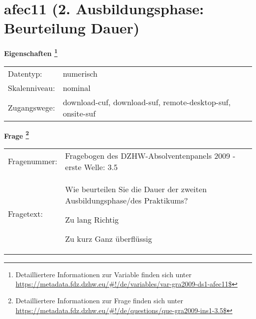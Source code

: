 
    \setcounter{footnote}{0}

    \vspace*{-1.8cm}
	\section{afec11 (2. Ausbildungsphase: Beurteilung Dauer)}
	\label{section:afec11}



    \vspace*{0.5cm}
    \noindent\textbf{Eigenschaften
	\footnote{Detailliertere Informationen zur Variable finden sich unter
		\url{https://metadata.fdz.dzhw.eu/\#!/de/variables/var-gra2009-ds1-afec11$}}}\\
	\begin{tabularx}{\hsize}{@{}lX}
	Datentyp: & numerisch \\
	Skalenniveau: & nominal \\
	Zugangswege: &
	  download-cuf, 
	  download-suf, 
	  remote-desktop-suf, 
	  onsite-suf
 \\
    \end{tabularx}



				\vspace*{0.5cm}
                \noindent\textbf{Frage
	                \footnote{Detailliertere Informationen zur Frage finden sich unter
		              \url{https://metadata.fdz.dzhw.eu/\#!/de/questions/que-gra2009-ins1-3.5$}}}\\
				\begin{tabularx}{\hsize}{@{}lX}
					Fragenummer: &
					  Fragebogen des DZHW-Absolventenpanels 2009 - erste Welle:
					  3.5
 \\
					Fragetext: & Wie beurteilen Sie die Dauer der zweiten Ausbildungsphase/des Praktikums?\par  Zu lang Richtig\par  Zu kurz Ganz überflüssig \\
				\end{tabularx}





